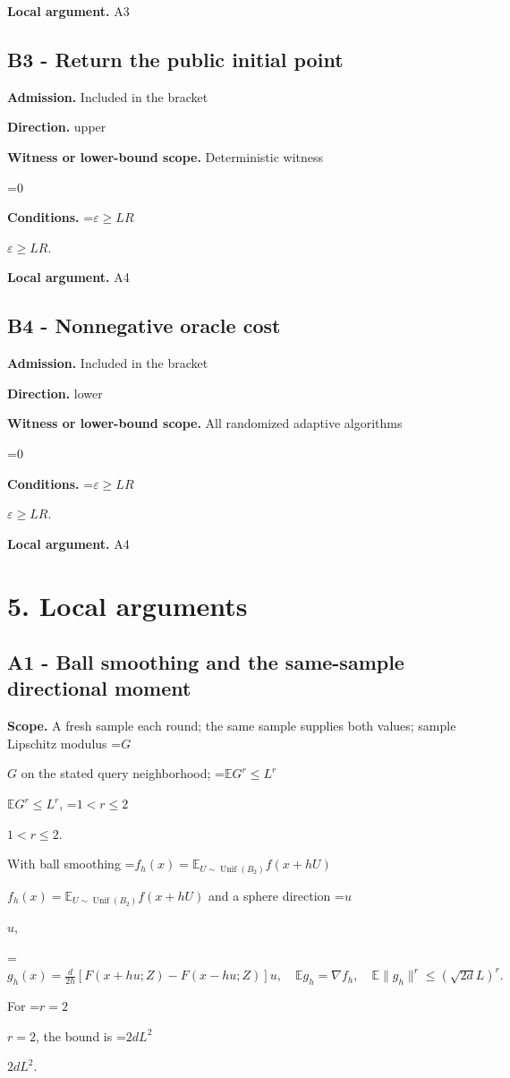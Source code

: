 \documentclass[10pt,a4paper]{article}
\newcommand{\AtlasMath}[1]{\par\begingroup\centering\setbox0=\hbox{$\displaystyle #1$}\ifdim\wd0>1.4\linewidth\typeout{ATLAS WIDE FORMULA: \the\wd0}\fi\ifdim\wd0>\linewidth\resizebox{\linewidth}{!}{\box0}\else\box0\fi\par\endgroup}
\newcommand{\AtlasInlineMath}[1]{\begingroup\setbox0=\hbox{$#1$}\ifdim\wd0>.4\linewidth\endgroup\AtlasMath{#1}\else\endgroup$#1$\fi}
\begin{document}
\textbf{Local argument.} A3

\subsection{B3 - Return the public initial point}
\textbf{Admission.} Included in the bracket

\textbf{Direction.} upper

\textbf{Witness or lower-bound scope.} Deterministic witness

\AtlasMath{0}
\textbf{Conditions.} \AtlasInlineMath{\varepsilon\ge LR}.

\textbf{Local argument.} A4

\subsection{B4 - Nonnegative oracle cost}
\textbf{Admission.} Included in the bracket

\textbf{Direction.} lower

\textbf{Witness or lower-bound scope.} All randomized adaptive algorithms

\AtlasMath{0}
\textbf{Conditions.} \AtlasInlineMath{\varepsilon\ge LR}.

\textbf{Local argument.} A4

\section{5. Local arguments}
\subsection{A1 - Ball smoothing and the same-sample directional moment}
\textbf{Scope.} A fresh sample each round; the same sample supplies both values; sample Lipschitz modulus \AtlasInlineMath{G} on the stated query neighborhood; \AtlasInlineMath{\mathbb E G^r\le L^r}, \AtlasInlineMath{1<r\le2}.

With ball smoothing \AtlasInlineMath{f_h(x)=\mathbb E_{U\sim\operatorname{Unif}(B_2)}f(x+hU)} and a sphere direction \AtlasInlineMath{u},

\AtlasMath{g_h(x)=\frac d{2h}[F(x+hu;Z)-F(x-hu;Z)]u,\quad\mathbb E g_h=\nabla f_h,\quad\mathbb E\|g_h\|^r\le(\sqrt{2d}L)^r.}

For \AtlasInlineMath{r=2}, the bound is \AtlasInlineMath{2dL^2}.
\end{document}

